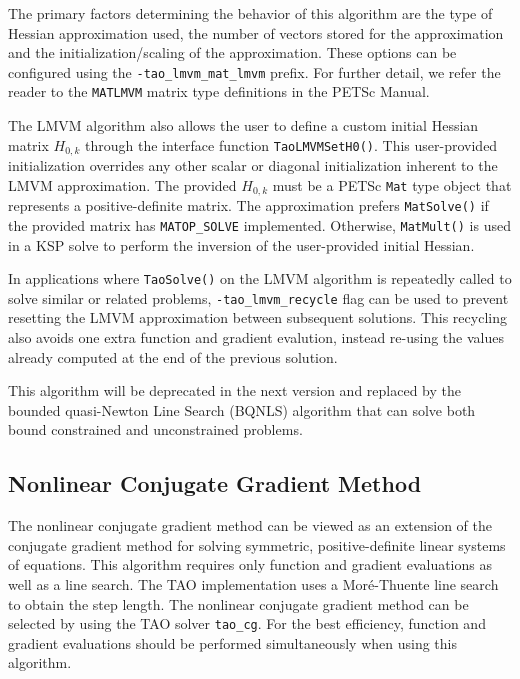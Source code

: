 \documentclass[]{book}
\begin{document}
The primary factors determining the behavior of this algorithm are the type 
of Hessian approximation used, the number of vectors stored for the approximation 
and the initialization/scaling of the approximation. These options can be 
configured using the {\tt -tao\_lmvm\_mat\_lmvm} prefix. For further detail, 
we refer the reader to the {\tt MATLMVM} matrix type definitions in the PETSc 
Manual.

The LMVM algorithm also allows the user to define a custom initial 
Hessian matrix $H_{0,k}$ through the interface function {\tt TaoLMVMSetH0()}. 
This user-provided initialization overrides any other scalar or diagonal 
initialization inherent to the LMVM approximation. The provided $H_{0,k}$ must 
be a PETSc {\tt Mat} type object that represents a positive-definite matrix. 
The approximation prefers {\tt MatSolve()} if the provided matrix has 
{\tt MATOP\_SOLVE} implemented. Otherwise, {\tt MatMult()} is used in a KSP 
solve to perform the inversion of the user-provided initial Hessian.

In applications where {\tt TaoSolve()} on the LMVM algorithm is repeatedly called 
to solve similar or related problems, {\tt -tao\_lmvm\_recycle} flag can be used 
to prevent resetting the LMVM approximation between subsequent solutions. This 
recycling also avoids one extra function and gradient evalution, instead re-using 
the values already computed at the end of the previous solution.

This algorithm will be deprecated in the next version and replaced by the 
bounded quasi-Newton Line Search (BQNLS) algorithm that can solve both bound constrained 
and unconstrained problems.

\subsection{Nonlinear Conjugate Gradient Method}%

The nonlinear conjugate gradient method can be viewed as an extension of the 
conjugate gradient method for solving symmetric, positive-definite linear 
systems of equations.  This algorithm requires only function and gradient 
evaluations as well as a line search.  The TAO implementation uses a 
Mor\'{e}-Thuente line search to obtain the step length.  The nonlinear 
conjugate gradient method can be selected by using the TAO solver 
{\tt tao\_cg}.  For the best efficiency, function and gradient evaluations 
should be performed simultaneously when using this algorithm.
\end{document}
